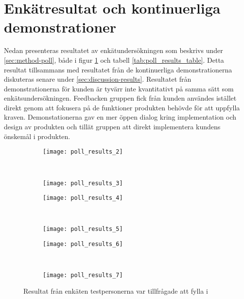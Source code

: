 \section{Enkätresultat och kontinuerliga demonstrationer}

Nedan presenteras resultatet av enkätundersökningen som beskrivs under \ref{sec:method-poll}, både i figur \ref{fig:poll_results} och tabell \ref{tab:poll_results_table}. Detta resultat tillsammans med resultatet från de kontinuerliga demonstrationerna diskuteras senare under \ref{sec:discussion-results}. Resultatet från demonstrationerna för kunden är tyvärr inte kvantitativt på samma sätt som enkätsundersökningen. Feedbacken gruppen fick från kunden användes istället direkt genom att fokusera på de funktioner produkten behövde för att uppfylla kraven. Demonstationerna gav en mer öppen dialog kring implementation och design av produkten och tillät gruppen att direkt implementera kundens önskemål i produkten.

\begin{figure}
    \centering
    \begin{subfigure}[]{0.5\textwidth}
        \centering
        \texttt{[image: poll\_results\_2]}
        \caption{}
    \end{subfigure}%
    ~
    \begin{subfigure}[]{0.5\textwidth}
        \centering
        \texttt{[image: poll\_results\_3]}
        \caption{}        
    \end{subfigure}

    \begin{subfigure}[]{0.5\textwidth}
        \centering
        \texttt{[image: poll\_results\_4]}
        \caption{}        
    \end{subfigure}%
    ~
    \begin{subfigure}[]{0.5\textwidth}
        \centering
        \texttt{[image: poll\_results\_5]}
        \caption{}        
    \end{subfigure}

    \begin{subfigure}[]{0.5\textwidth}
        \centering
        \texttt{[image: poll\_results\_6]}
        \caption{}        
    \end{subfigure}%
    ~
    \begin{subfigure}[]{0.5\textwidth}
        \centering
        \texttt{[image: poll\_results\_7]}
        \caption{}    
    \end{subfigure}
    \caption{Resultat från enkäten testpersonerna var tillfrågade att fylla i}
    \label{fig:poll_results}
\end{figure}

